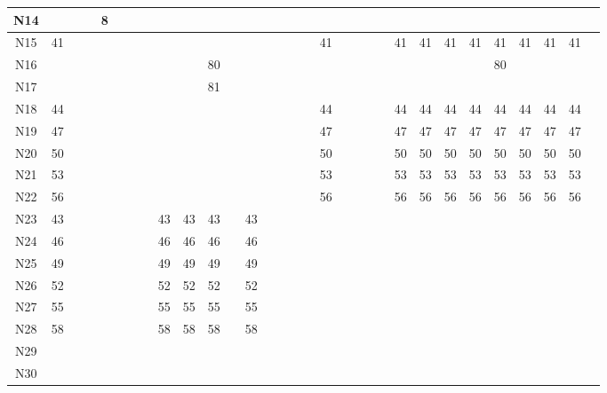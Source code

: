\documentclass[11pt,a4paper]{article}
\begin{document}
\begin{lrbox}{\lltablebox}
\begin{tabular}{|*{31}{c|}}
N14 &  &  &  & 8 &  &  &  &  &  &  &  &  &  &  &  &  &  &  &  &  &  &  &  &  &  &  &  &  &  &  \\ \hline
N15 & 41 &  &  &  &  &  &  &  &  &  &  &  &  &  &  &  & 41 &  &  &  &  & 41 & 41 & 41 & 41 & 41 & 41 & 41 & 41 &  \\ \hline
N16 &  &  &  &  &  &  &  &  &  & 80 &  &  &  &  &  &  &  &  &  &  &  &  &  &  &  & 80 &  &  &  &  \\ \hline
N17 &  &  &  &  &  &  &  &  &  & 81 &  &  &  &  &  &  &  &  &  &  &  &  &  &  &  &  &  &  &  &  \\ \hline
N18 & 44 &  &  &  &  &  &  &  &  &  &  &  &  &  &  &  & 44 &  &  &  &  & 44 & 44 & 44 & 44 & 44 & 44 & 44 & 44 &  \\ \hline
N19 & 47 &  &  &  &  &  &  &  &  &  &  &  &  &  &  &  & 47 &  &  &  &  & 47 & 47 & 47 & 47 & 47 & 47 & 47 & 47 &  \\ \hline
N20 & 50 &  &  &  &  &  &  &  &  &  &  &  &  &  &  &  & 50 &  &  &  &  & 50 & 50 & 50 & 50 & 50 & 50 & 50 & 50 &  \\ \hline
N21 & 53 &  &  &  &  &  &  &  &  &  &  &  &  &  &  &  & 53 &  &  &  &  & 53 & 53 & 53 & 53 & 53 & 53 & 53 & 53 &  \\ \hline
N22 & 56 &  &  &  &  &  &  &  &  &  &  &  &  &  &  &  & 56 &  &  &  &  & 56 & 56 & 56 & 56 & 56 & 56 & 56 & 56 &  \\ \hline
N23 & 43 &  &  &  &  &  &  & 43 & 43 & 43 &  & 43 &  &  &  &  &  &  &  &  &  &  &  &  &  &  &  &  &  &  \\ \hline
N24 & 46 &  &  &  &  &  &  & 46 & 46 & 46 &  & 46 &  &  &  &  &  &  &  &  &  &  &  &  &  &  &  &  &  &  \\ \hline
N25 & 49 &  &  &  &  &  &  & 49 & 49 & 49 &  & 49 &  &  &  &  &  &  &  &  &  &  &  &  &  &  &  &  &  &  \\ \hline
N26 & 52 &  &  &  &  &  &  & 52 & 52 & 52 &  & 52 &  &  &  &  &  &  &  &  &  &  &  &  &  &  &  &  &  &  \\ \hline
N27 & 55 &  &  &  &  &  &  & 55 & 55 & 55 &  & 55 &  &  &  &  &  &  &  &  &  &  &  &  &  &  &  &  &  &  \\ \hline
N28 & 58 &  &  &  &  &  &  & 58 & 58 & 58 &  & 58 &  &  &  &  &  &  &  &  &  &  &  &  &  &  &  &  &  &  \\ \hline
N29 &  &  &  &  &  &  &  &  &  &  &  &  &  &  &  &  &  &  &  &  &  &  &  &  &  &  &  &  &  &  \\ \hline
N30 &  &  &  &  &  &  &  &  &  &  &  &  &  &  &  &  &  &  &  &  &  &  &  &  &  &  &  &  &  &  \\ \hline

\end{tabular}
\end{lrbox}
\end{document}
